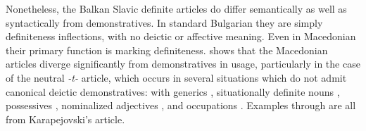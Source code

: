 \documentclass[output=paper,
colorlinks,
citecolor=brown,
newtxmath
]{langscibook}
\begin{document}
Nonetheless, the Balkan Slavic definite articles do differ semantically as well as syntactically from demonstratives. In standard Bulgarian they are simply definiteness inflections, with no deictic or affective meaning. Even in Macedonian their primary function is marking definiteness. \cite{Karapejovski2017} shows that the Macedonian articles diverge significantly from demonstratives in usage, particularly in the case of the neutral \textit{-t-} article, which occurs in several situations which do not admit canonical deictic demonstratives: with generics , situationally definite nouns , possessives , nominalized adjectives , and occupations . Examples  through  are all from Karapejovski's article.




\end{document}
